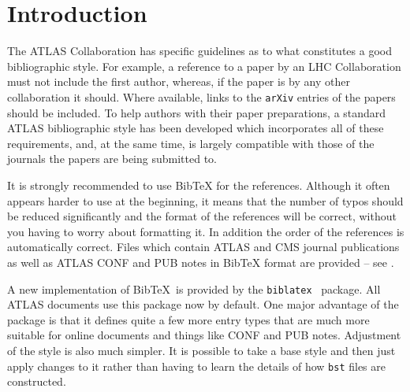 \documentclass[UKenglish, texlive=2016]{\ATLASLATEXPATH atlasdoc}
\author{Ian C. Brock}
\affil{University of Bonn}
\newcommand*{\BibTeX}{Bib\TeX}
\newcommand{\Package}[1]{\texttt{#1}\xspace}
\begin{document}
\maketitle

\tableofcontents

\section{Introduction}

The ATLAS Collaboration has specific guidelines as to what constitutes a good bibliographic style.
For example, a reference to a paper by an LHC Collaboration must not include the first author,
whereas, if the paper is by any other collaboration it should.
Where available, links to the \texttt{arXiv} entries of the papers should be included.
To help authors with their paper preparations,
a standard ATLAS bibliographic style has been developed which incorporates all of these requirements,
and, at the same time, is largely compatible with those of the journals the papers are being submitted to.

It is strongly recommended to use \BibTeX{} for the references.
Although it often appears harder to use at the beginning, it means that the number of
typos should be reduced significantly and the format of the references
will be correct, without you having to worry about formatting it.
In addition the order of the references is automatically correct.
Files which contain ATLAS and CMS journal publications
as well as ATLAS CONF and PUB notes in \BibTeX{} format are provided -- see \Sect{\ref{sec:atlascmsrefs}}.

A new implementation of \BibTeX\ is provided by the \Package{biblatex}~\cite{biblatex} package.
All ATLAS documents use this package now by default.
One major advantage of the package is that it defines quite a few more entry types
that are much more suitable for online documents and things like CONF and PUB notes.
Adjustment of the style is also much simpler.
It is possible to take a base style and then just apply changes to it rather than
having to learn the details of how \texttt{bst} files are constructed.
\end{document}
